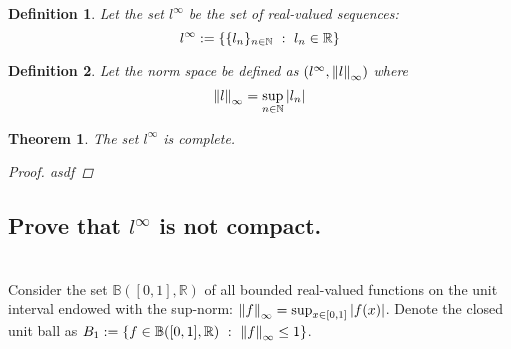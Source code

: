 \documentclass[]{article}
\newcommand{\R}{\mathbb{R}}
\newcommand{\N}{\mathbb{N}}
\newcommand{\st}{\ : \ }
\newtheorem{definition}{Definition}
\newtheorem{theorem}{Theorem}
\begin{document}
\begin{definition}
    Let the set $l^\infty$ be the set of real-valued sequences:
    \[
        l^{\infty} := \qty{\{l_n\}_{n\in \N} \st l_n \in \R}
    \]
\end{definition}
\begin{definition}
    Let the norm space be defined as $(l^\infty, \norm{l}_\infty)$ where \[\norm{l}_\infty = \sup_{n\in\N} \abs{l_n}\]
\end{definition}

\begin{theorem}
    The set $l^\infty$ is complete.
    \begin{proof}
        asdf
    \end{proof}
\end{theorem}



\subsection{Prove that $l^\infty$ is not compact.}






\newpage
\section{}
Consider the set $\mathbb{B}([0,1],\R)$ of all bounded real-valued functions on the unit interval endowed with the sup-norm: $\norm{f}_\infty = \sup_{x \in [0,1]} \abs{f(x)}$. Denote the closed unit ball as $B_1 := \qty{f \in \mathbb{B}([0,1],\R) \st \norm{f}_\infty \leq 1}$.


\end{document}
